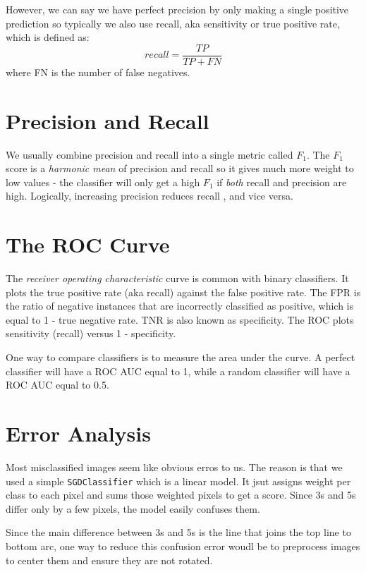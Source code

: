 \documentclass[11pt]{article}
\begin{document}
However, we can say we have perfect precision by only making a single positive prediction so typically we also use recall, aka sensitivity or true positive rate, which is defined as:
\[recall = \frac{TP}{TP + FN}\]
where FN is the number of false negatives. 

\section{Precision and Recall}

We usually combine precision and recall into a single metric called $F_{1}$. The $F_{1}$ score is a \emph{harmonic mean} of precision and recall so it gives much more weight to low values - the classifier will only get a high $F_{1}$ if \emph{both} recall and precision are high. Logically, increasing precision reduces recall , and vice versa. 

\section{The ROC Curve}

The \emph{receiver operating characteristic} curve is common with binary classifiers. It plots the true positive rate (aka recall) against the false positive rate. The FPR is the ratio of negative instances that are incorrectly classified as positive, which is equal to 1 - true negative rate. TNR is also known as specificity. The ROC plots sensitivity (recall) versus 1 - specificity. 

One way to compare classifiers is to measure the area under the curve. A perfect classifier will have a ROC AUC equal to 1, while a random classifier will have a ROC AUC equal to 0.5. 

\section{Error Analysis}

Most misclassified images seem like obvious erros to us. The reason is that we used a simple \verb|SGDClassifier| which is a linear model. It jsut assigns weight per class to each pixel and sums those weighted pixels to get a score. Since 3s and 5s differ only by a few pixels, the model easily confuses them. 

Since the main difference between 3s and 5s is the line that joins the top line to bottom arc, one way to reduce this confusion error woudl be to preprocess images to center them and ensure they are not rotated.
\end{document}
